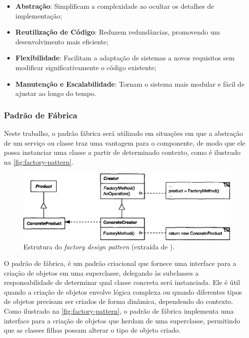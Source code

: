 \documentclass[a4paper, 12pt]{article}
\newcommand{\citeb}[1]{\bibleftbracket\cite{#1}\bibrightbracket}
\begin{document}
    \begin{itemize}
        \item \textbf{Abstração}: Simplificam a complexidade ao ocultar os detalhes de implementação;
        \item \textbf{Reutilização de Código}: Reduzem redundâncias, promovendo um desenvolvimento mais eficiente;
        \item \textbf{Flexibilidade}: Facilitam a adaptação de sistemas a novos requisitos sem modificar significativamente o código existente;
        \item \textbf{Manutenção e Escalabilidade}: Tornam o sistema mais modular e fácil de ajustar ao longo do tempo.
    \end{itemize}
    
    \subsubsection{Padrão de Fábrica} \label{sec:factory_pattern}

    Neste trabalho, o padrão fábrica será utilizado em situações em que a abstração de um serviço ou classe traz uma vantagem para o componente, de modo que ele possa instanciar uma classe a partir de determinado contexto, como é ilustrado na \autoref{fig:factory-pattern}.
    
    \begin{figure}[ht]
        \includegraphics[width=\textwidth,height=0.9\textheight,keepaspectratio]{images/factory-design-pattern.jpg}
        \centering
        \caption{Estrutura do \textit{factory design pattern} (extraída de \citeb{design_patterns}).}
        \centering
        \label{fig:factory-pattern}
    \end{figure}
    
    O padrão de fábrica, é um padrão criacional que fornece uma interface para a criação de objetos em uma superclasse, delegando às subclasses a responsabilidade de determinar qual classe concreta será instanciada. Ele é útil quando a criação de objetos envolve lógica complexa ou quando diferentes tipos de objetos precisam ser criados de forma dinâmica, dependendo do contexto. Como ilustrado na \autoref{fig:factory-pattern}, o padrão de fábrica implementa uma interface para a criação de objetos que herdam de uma superclasse, permitindo que as classes filhas possam alterar o tipo de objeto criado. 
\end{document}
